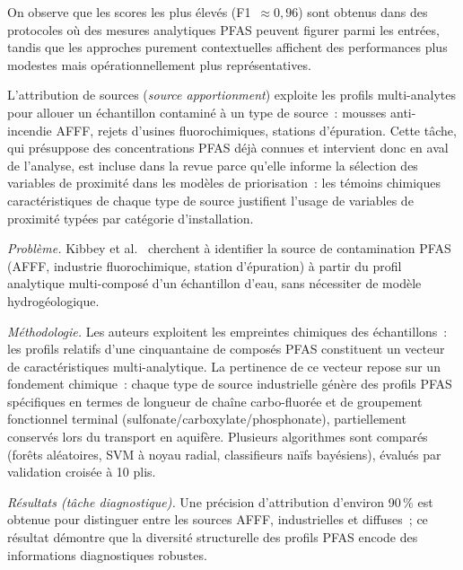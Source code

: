 On observe que les scores les plus \'elev\'es (F1~$\approx 0{,}96$) sont obtenus dans des protocoles o\`u des mesures analytiques PFAS peuvent figurer parmi les entr\'ees, tandis que les approches purement contextuelles affichent des performances plus modestes mais op\'erationnellement plus repr\'esentatives.


\label{sec:chap2-attribution}

L'attribution de sources (\emph{source apportionment}) exploite les profils multi-analytes pour allouer un \'echantillon contamin\'e \`a un type de source~: mousses anti-incendie AFFF, rejets d'usines fluorochimiques, stations d'\'epuration.
Cette t\^ache, qui pr\'esuppose des concentrations PFAS d\'ej\`a connues et intervient donc en aval de l'analyse, est incluse dans la revue parce qu'elle informe la s\'election des variables de proximit\'e dans les mod\`eles de priorisation~: les t\'emoins chimiques caract\'eristiques de chaque type de source justifient l'usage de variables de proximit\'e typ\'ees par cat\'egorie d'installation.


\label{sec:art-kibbey2020}

\emph{Probl\`eme.}
Kibbey et al.~\cite{kibbey2020pfas} cherchent \`a identifier la source de contamination PFAS (AFFF, industrie fluorochimique, station d'\'epuration) \`a partir du profil analytique multi-compos\'e d'un \'echantillon d'eau, sans n\'ecessiter de mod\`ele hydrog\'eologique.

\emph{M\'ethodologie.}
Les auteurs exploitent les empreintes chimiques des \'echantillons~: les profils relatifs d'une cinquantaine de compos\'es PFAS constituent un vecteur de caract\'eristiques multi-analytique.
La pertinence de ce vecteur repose sur un fondement chimique~: chaque type de source industrielle g\'en\`ere des profils PFAS sp\'ecifiques en termes de longueur de cha\^ine carbo-fluor\'ee et de groupement fonctionnel terminal (sulfonate/carboxylate/phosphonate), partiellement conserv\'es lors du transport en aquif\`ere.
Plusieurs algorithmes sont compar\'es (for\^ets al\'eatoires, SVM \`a noyau radial, classifieurs na\"ifs bay\'esiens), \'evalu\'es par validation crois\'ee \`a 10 plis.

\emph{R\'esultats (t\^ache diagnostique).}
Une pr\'ecision d'attribution d'environ 90\,\% est obtenue pour distinguer entre les sources AFFF, industrielles et diffuses~; ce r\'esultat d\'emontre que la diversit\'e structurelle des profils PFAS encode des informations diagnostiques robustes.

